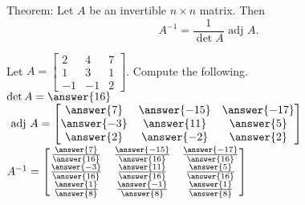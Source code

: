 \documentclass{ximera}
\newcommand{\adj}{\text{ adj }}
\begin{document}
          \begin{question} Theorem: Let $A$ be an invertible $n\times n$ matrix. Then $$A^{-1} = \dfrac{1}{\det A}  \adj  A.$$
          	
          Let $A = \begin{bmatrix} 2& 4& 7\\ 1& 3&1\\ -1&-1&2\end{bmatrix}$. Compute the following.\vspace{10pt}\\
          
          $\det A = \answer{16}$\vspace{10pt}\\
          
          $\adj A = \begin{bmatrix} 
          \answer{7} & \answer{-15} &\answer{-17}\\
          \answer{-3} & \answer{11} &\answer{5}\\
          \answer{2} & \answer{-2} &\answer{2} \end{bmatrix}$\vspace{10pt}\\
          
      
          
          $A^{-1} =   \begin{bmatrix} 
          	\frac{\answer{7}}{\answer{16}} & \frac{\answer{-15}}{\answer{16}} &\frac{\answer{-17}}{\answer{16}}\\
          	\frac{\answer{-3}}{\answer{16}}& \frac{\answer{11}}{\answer{16}} &\frac{\answer{5}}{\answer{16}}\\
          	\frac{\answer{1}}{\answer{8} }& \frac{\answer{-1}}{\answer{8}} &\frac{\answer{1}}{\answer{8}} \end{bmatrix}$
          	
          	
          \end{question}	
  
\end{document}
